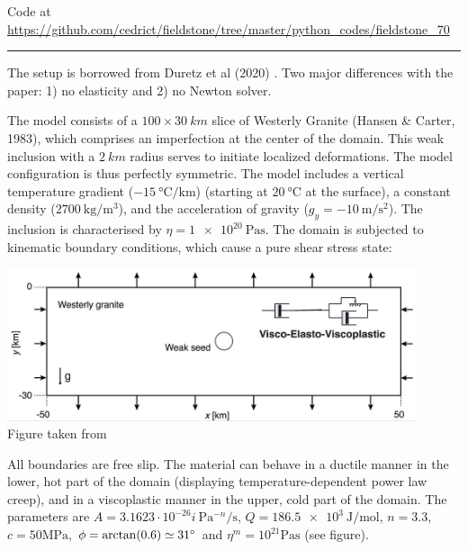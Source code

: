 

\begin{center}
Code at \url{https://github.com/cedrict/fieldstone/tree/master/python_codes/fieldstone_70}
\end{center}

\par\noindent\rule{\textwidth}{0.4pt}


The setup is borrowed from Duretz et al (2020) \cite{dudy20}. 
Two major differences with the paper: 1) no elasticity and 2) no Newton solver.

The model consists of a $100\times 30~\si{km}$ slice of Westerly Granite (Hansen \& Carter, 1983), 
which comprises an imperfection at the center of the domain.
This weak inclusion with a $2~\si{km}$ radius serves to initiate
localized deformations. The model configuration is thus perfectly symmetric. 
The model includes a vertical temperature gradient ($-15~\si{\celsius\per\km}$) (starting 
at $20~\si{\celsius}$ at the surface), a constant density ($\SI{2700}{\kg\per\cubic\metre}$), 
and the acceleration of gravity ($g_y=-\SI{10}{\metre\per\second\squared}$).
The inclusion is characterised by $\eta=\SI{1e20}{\pascal\second}$.
The domain is subjected to kinematic boundary conditions, which cause a pure shear stress state:

\begin{center}
\includegraphics[width=12cm]{python_codes/fieldstone_70/images/fig1}\\
{\captionfont Figure taken from \cite{dudy20}}
\end{center}

All boundaries are free slip. The material can behave in a ductile manner in the lower, hot
part of the domain (displaying temperature-dependent power law creep), and in a viscoplastic 
manner in the upper, cold part of the domain. The parameters are 
$A=3.1623\cdot 10^{-26}i~\si{\pascal^{-n}\per\second}$, 
$Q=\SI{186.5e3}{\joule\per\mole}$, 
$n=3.3$, $c=50\si{\mega\pascal}$, $\phi=\arctan(0.6)\simeq 31\degree$ and 
$\eta^{m}=10^{21}\si{\pascal\second}$ (see figure).

